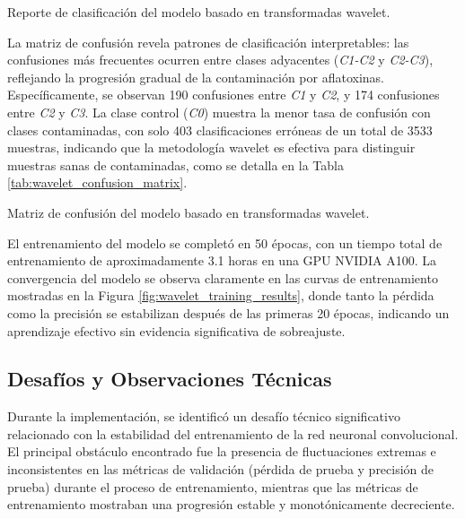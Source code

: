 \begin{table}[ht]
\centering
\caption{Reporte de clasificación del modelo basado en transformadas wavelet.}
\label{tab:wavelet_report}
\end{table}

\vspace{5mm}

La matriz de confusión revela patrones de clasificación interpretables: las confusiones más frecuentes ocurren entre clases adyacentes (\emph{C1-C2} y \emph{C2-C3}), reflejando la progresión gradual de la contaminación por aflatoxinas. Específicamente, se observan 190 confusiones entre \emph{C1} y \emph{C2}, y 174 confusiones entre \emph{C2} y \emph{C3}. La clase control (\emph{C0}) muestra la menor tasa de confusión con clases contaminadas, con solo 403 clasificaciones erróneas de un total de 3533 muestras, indicando que la metodología wavelet es efectiva para distinguir muestras sanas de contaminadas, como se detalla en la Tabla \ref{tab:wavelet_confusion_matrix}.

\begin{table}[ht]
\centering
\caption{Matriz de confusión del modelo basado en transformadas wavelet.}
\label{tab:wavelet_confusion_matrix}
\end{table}

\vspace{5mm}

El entrenamiento del modelo se completó en 50 épocas, con un tiempo total de entrenamiento de aproximadamente 3.1 horas en una GPU NVIDIA A100. La convergencia del modelo se observa claramente en las curvas de entrenamiento mostradas en la Figura \ref{fig:wavelet_training_results}, donde tanto la pérdida como la precisión se estabilizan después de las primeras 20 épocas, indicando un aprendizaje efectivo sin evidencia significativa de sobreajuste.

\subsection{Desafíos y Observaciones Técnicas}

Durante la implementación, se identificó un desafío técnico significativo relacionado con la estabilidad del entrenamiento de la red neuronal convolucional. El principal obstáculo encontrado fue la presencia de fluctuaciones extremas e inconsistentes en las métricas de validación (pérdida de prueba y precisión de prueba) durante el proceso de entrenamiento, mientras que las métricas de entrenamiento mostraban una progresión estable y monotónicamente decreciente.

